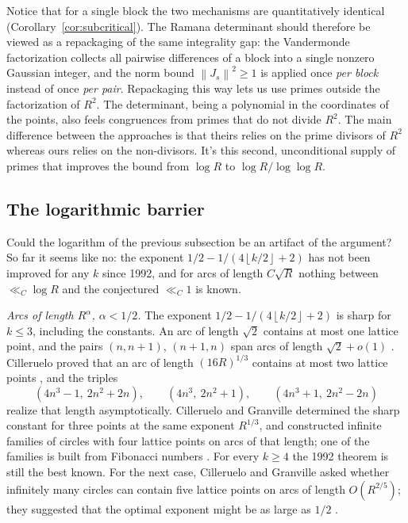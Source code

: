 \documentclass[11pt]{article}
\newcommand{\Norm}[1]{\left\lVert#1\right\rVert^2}
\newcommand{\floor}[1]{\left\lfloor #1 \right\rfloor}
\begin{document}
Notice that for a single block the two mechanisms are quantitatively identical (Corollary~\ref{cor:subcritical}).
The Ramana determinant should therefore be viewed as a repackaging of the same integrality gap: the Vandermonde factorization collects all pairwise differences of a block into a single nonzero Gaussian integer, and the norm bound \(\Norm{J_s}\ge1\) is applied once \textit{per block} instead of once \textit{per pair}.
Repackaging this way lets us use primes outside the factorization of \(R^2\).
The determinant, being a polynomial in the coordinates of the points, also feels congruences from primes that do not divide $R^2$.
The main difference between the approaches is that theirs relies on the prime divisors of $R^2$ whereas ours relies on the non-divisors.
It's this second, unconditional supply of primes that improves the bound from \(\log R\) to \(\log R/\log\log R\).

\subsection{The logarithmic barrier}
\label{subsec:log-barrier}

Could the logarithm of the previous subsection be an artifact of the argument?
So far it seems like no: the exponent \(1/2-1/(4\floor{k/2}+2)\) has not been improved for any \(k\) since 1992, and for arcs of length \(C\sqrt R\) nothing between \(\ll_C\log R\) and the conjectured \(\ll_C1\) is known.

\emph{Arcs of length \(R^{\alpha}\), \(\alpha<1/2\).}
The exponent \(1/2-1/(4\floor{k/2}+2)\) is sharp for \(k\le3\), including the constants.
An arc of length \(\sqrt2\) contains at most one lattice point, and the pairs \((n,n+1)\), \((n+1,n)\) span arcs of length \(\sqrt2+o(1)\) \cite{CillerueloGranville2007}.
Cilleruelo proved that an arc of length \((16R)^{1/3}\) contains at most two lattice points \cite{Cilleruelo1991}, and the triples
\[
  (4n^3-1,\ 2n^2+2n),\qquad (4n^3,\ 2n^2+1),\qquad (4n^3+1,\ 2n^2-2n)
\]
realize that length asymptotically.
Cilleruelo and Granville determined the sharp constant for three points at the same exponent \(R^{1/3}\), and constructed infinite families of circles with four lattice points on arcs of that length; one of the families is built from Fibonacci numbers \cite{CillerueloGranville2009}.
For every \(k\ge4\) the 1992 theorem is still the best known.
For the next case, Cilleruelo and Granville asked whether infinitely many circles can contain five lattice points on arcs of length \(O(R^{2/5})\); they suggested that the optimal exponent might be as large as \(1/2\) \cite[Problem~1]{CillerueloGranville2009}.
\end{document}
